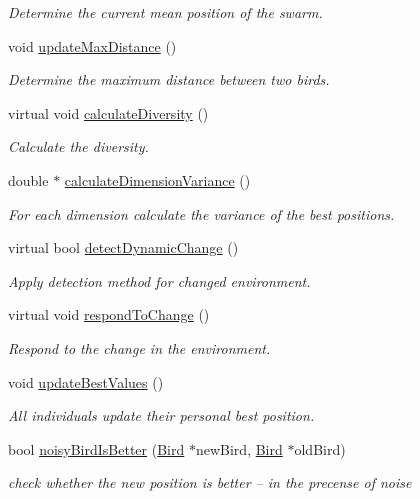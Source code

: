 \begin{CompactItemize}
\begin{CompactList}\small\item\em Determine the current mean position of the swarm. \item\end{CompactList}\item 
void \hyperlink{classSwarm_5ef674f56c0bb5276aab56f456bd16b4}{updateMaxDistance} ()
\begin{CompactList}\small\item\em Determine the maximum distance between two birds. \item\end{CompactList}\item 
virtual void \hyperlink{classSwarm_849d8809ea9c26d9bc0010968bf1020c}{calculateDiversity} ()
\begin{CompactList}\small\item\em Calculate the diversity. \item\end{CompactList}\item 
double $\ast$ \hyperlink{classSwarm_e8074ca91d00f4dd90b2d1101db2b9cd}{calculateDimensionVariance} ()
\begin{CompactList}\small\item\em For each dimension calculate the variance of the best positions. \item\end{CompactList}\item 
virtual bool \hyperlink{classSwarm_2ff0a2521e41d8b26e031e5a08c583b5}{detectDynamicChange} ()
\begin{CompactList}\small\item\em Apply detection method for changed environment. \item\end{CompactList}\item 
virtual void \hyperlink{classSwarm_f98488b9ca17c07c89a591040f360db6}{respondToChange} ()
\begin{CompactList}\small\item\em Respond to the change in the environment. \item\end{CompactList}\item 
void \hyperlink{classSwarm_68f5ddc7a3335954f42cc01366ab374d}{updateBestValues} ()
\begin{CompactList}\small\item\em All individuals update their personal best position. \item\end{CompactList}\item 
bool \hyperlink{classSwarm_37d9b1abc4dac92ed426bcc50912fc76}{noisyBirdIsBetter} (\hyperlink{classBird}{Bird} $\ast$newBird, \hyperlink{classBird}{Bird} $\ast$oldBird)
\begin{CompactList}\small\item\em check whether the new position is better -- in the precense of noise \item\end{CompactList}\end{CompactItemize}
